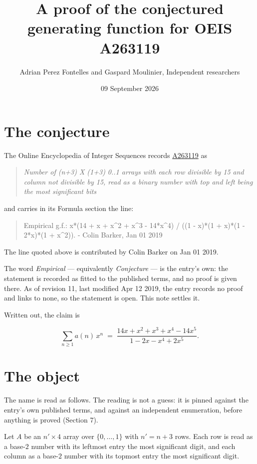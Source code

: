 \documentclass[11pt]{article}
\title{A proof of the conjectured generating function for OEIS A263119}
\author{Adrian Perez Fontelles and Gaspard Moulinier, Independent researchers}
\date{09 September 2026}
\theoremstyle{definition}
\begin{document}
\maketitle
\section{The conjecture}

The Online Encyclopedia of Integer Sequences records \href{https://oeis.org/A263119}{A263119} as

\begin{quote}\itshape Number of (n+3) X (1+3) 0..1 arrays with each row divisible by 15 and column not divisible by 15, read as a binary number with top and left being the most significant bits\end{quote}

and carries in its Formula section the line:

\begin{quote}\ttfamily Empirical g.f.: x*(14 + x + x\textasciicircum{}2 + x\textasciicircum{}3 - 14*x\textasciicircum{}4) / ((1 - x)*(1 + x)*(1 - 2*x)*(1 + x\textasciicircum{}2)). - Colin Barker, Jan 01 2019\end{quote}

The line quoted above is contributed by Colin Barker on Jan 01 2019.

The word {\itshape Empirical} --- equivalently {\itshape Conjecture} --- is the entry's own: the statement is recorded as fitted to the published terms, and no proof is given there. As of revision 11, last modified Apr 12 2019, the entry records no proof and links to none, so the statement is open. This note settles it.

Written out, the claim is

\[\sum_{n \ge 1} a(n)\,x^n \;=\; \frac{14x + x^{2} + x^{3} + x^{4} - 14x^{5}}{1 - 2x - x^{4} + 2x^{5}}.\]

\section{The object}

The name is read as follows. The reading is not a guess: it is pinned against the entry's own published terms, and against an independent enumeration, before anything is proved (Section 7).

Let $A$ be an $n' \times 4$ array over $\{0,\dots,1\}$ with $n' = n + 3$ rows. Each row is read as a base-$2$ number with its leftmost entry the most significant digit, and each column as a base-$2$ number with its topmost entry the most significant digit.
\end{document}
